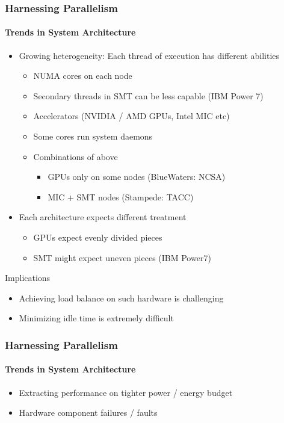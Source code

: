 \begin{frame}[t]
\frametitle{Harnessing Parallelism}
\framesubtitle{Trends in System Architecture}
    \begin{itemize}
        \item Growing heterogeneity: Each thread of execution has different abilities
            \begin{itemize}
                \item NUMA cores on each node
                \item Secondary threads in SMT can be less capable (IBM Power 7)
                \item Accelerators (NVIDIA / AMD GPUs, Intel MIC etc)
                \item Some cores run system daemons
                \item Combinations of above
                    \begin{itemize}
                        \item GPUs only on some nodes (BlueWaters: NCSA)
                        \item MIC + SMT nodes (Stampede: TACC)
                    \end{itemize}
            \end{itemize}
        \pause
        \item Each architecture expects different treatment
            \begin{itemize}
                \item GPUs expect evenly divided pieces
                \item SMT might expect uneven pieces (IBM Power7)
            \end{itemize}
    \end{itemize}
    \pause
    \begin{block}{Implications}
        \begin{itemize}
            \item Achieving load balance on such hardware is challenging
            \item Minimizing idle time is extremely difficult
        \end{itemize}
    \end{block}
\end{frame}


\begin{frame}[t]
\frametitle{Harnessing Parallelism}
\framesubtitle{Trends in System Architecture}
  \begin{itemize}
  \item Extracting performance on tighter power / energy budget
  \item Hardware component failures / faults
  \end{itemize}
\end{frame}


